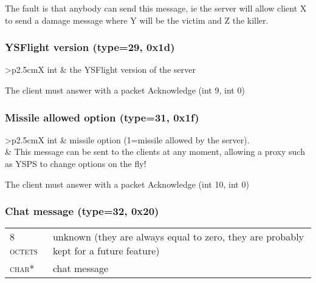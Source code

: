 \documentclass{article}
\newcommand{\gray}{\rowcolor[gray]{.92}}
\begin{document}
The fault is that anybody can send this message, ie the server will allow client X to send a damage message where Y will be the victim and Z the killer.

\vspace{0.4cm}
\subsubsection{YSFlight version (type=29, 0x1d)}
\begin{tabularx}{\linewidth}{>{\raggedleft\scshape\small}p{2.5cm}X}
int & the YSFlight version of the server\\
\end{tabularx}

\vspace{0.2cm}
The client must answer with a packet Acknowledge (int 9, int 0)


\vspace{0.4cm}
\subsubsection{Missile allowed option (type=31, 0x1f)}
\begin{tabularx}{\linewidth}{>{\raggedleft\scshape\small}p{2.5cm}X}
 int & missile option (1=missile allowed by the server).\\
 & This message can be sent to the clients at any moment, allowing a proxy such as YSPS to change options on the fly!\\
\end{tabularx}

\vspace{0.2cm}
The client must answer with a packet Acknowledge (int 10, int 0)


\vspace{0.4cm}
\subsubsection{Chat message (type=32, 0x20)}
\begin{tabularx}{\linewidth}{>{\raggedleft\scshape\small}p{2.5cm}X}
8 octets & unknown (they are always equal to zero, they are probably kept for a future feature)\\
\gray char* & chat message\\

\end{tabularx}


\vspace{0.4cm}
\end{document}

